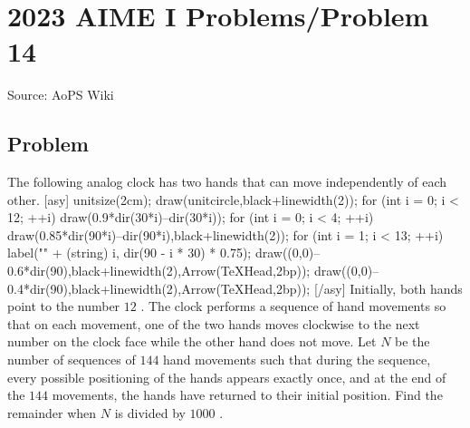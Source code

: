 \documentclass[12pt]{article}
\begin{document}
\section*{{2023 AIME I Problems/Problem 14}}
Source: AoPS Wiki

\subsection*{Problem}
The following analog clock has two hands that can move independently of each other. [asy] unitsize(2cm); draw(unitcircle,black+linewidth(2)); for (int i = 0; i < 12; ++i) { draw(0.9*dir(30*i)--dir(30*i)); } for (int i = 0; i < 4; ++i) { draw(0.85*dir(90*i)--dir(90*i),black+linewidth(2)); } for (int i = 1; i < 13; ++i) { label("\small" + (string) i, dir(90 - i * 30) * 0.75); } draw((0,0)--0.6*dir(90),black+linewidth(2),Arrow(TeXHead,2bp)); draw((0,0)--0.4*dir(90),black+linewidth(2),Arrow(TeXHead,2bp)); [/asy] Initially, both hands point to the number $12$ . The clock performs a sequence of hand movements so that on each movement, one of the two hands moves clockwise to the next number on the clock face while the other hand does not move. Let $N$ be the number of sequences of $144$ hand movements such that during the sequence, every possible positioning of the hands appears exactly once, and at the end of the $144$ movements, the hands have returned to their initial position. Find the remainder when $N$ is divided by $1000$ .
\end{document}
